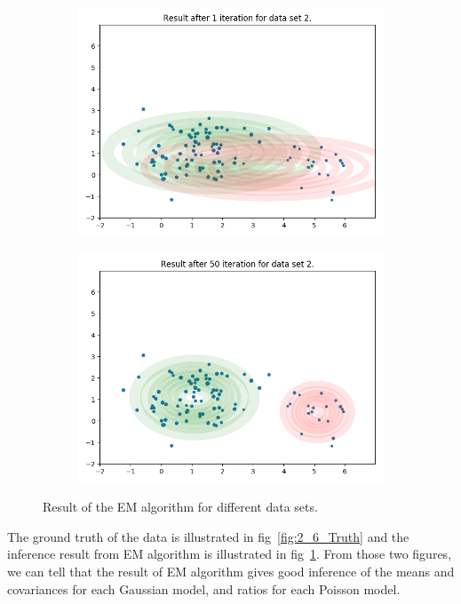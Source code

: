 \documentclass[11pt]{extarticle}
\newcommand{\0}{\mathbf{0}}
\renewcommand{\(}{\left(}
\renewcommand{\)}{\right)}
\theoremstyle{definition}
\begin{document}
\begin{figure}[!ht]
\begin{subfigure}{.49\textwidth}
		\includegraphics[width=\linewidth]{2_6_EM2_1}
	\end{subfigure}
	\begin{subfigure}{.49\textwidth}
		\centering
		\includegraphics[width=\linewidth]{2_6_EM2_50}
	\end{subfigure}
	\caption{Result of the EM algorithm for different data sets.}
	\label{fig:2_6_Result}
\end{figure}
\par The ground truth of the data is illustrated in fig~\ref{fig:2_6_Truth} and the inference result from EM algorithm is illustrated in fig~\ref{fig:2_6_Result}. From those two figures, we can tell that the result of EM algorithm gives good inference of the means and covariances for each Gaussian model, and ratios for each Poisson model.
\end{document}

